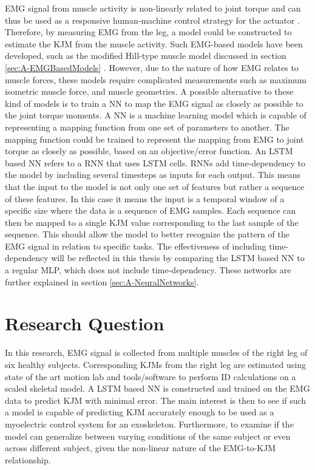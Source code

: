 \documentclass[../main.tex]{subfiles}
\begin{document}
\Ac{EMG} signal from muscle activity is non-linearly related to joint torque and can thus be used as a responsive human-machine control strategy for the actuator \cite{Young2017}.
Therefore, by measuring \ac{EMG} from the leg, a model could be constructed to estimate the \ac{KJM} from the muscle activity.
Such \ac{EMG}-based models have been developed, such as the modified Hill-type muscle model discussed in section \ref{sec:A-EMGBasedModels} \cite{Pizzolato2015, Erdemir2007, Lloyd2003}.
However, due to the nature of how \ac{EMG} relates to muscle forces, these models require complicated measurements such as maximum isometric muscle force, and muscle geometries.
A possible alternative to these kind of models is to train a \ac{NN} to map the \ac{EMG} signal as closely as possible to the joint torque moments.
A \ac{NN} is a machine learning model which is capable of representing a mapping function from one set of parameters to another. 
The mapping function could be trained to represent the mapping from \ac{EMG} to joint torque as closely as possible, based on an objective/error function.
An \ac{LSTM} based \ac{NN} refers to a \ac{RNN} that uses \ac{LSTM} cells.
\acp{RNN} add time-dependency to the model by including several timesteps as inputs for each output.
This means that the input to the model is not only one set of features but rather a sequence of these features.
In this case it means the input is a temporal window of a specific size where the data is a sequence of \ac{EMG} samples.
Each sequence can then be mapped to a single \ac{KJM} value corresponding to the last sample of the sequence.
This should allow the model to better recognize the pattern of the \ac{EMG} signal in relation to specific tasks.
The effectiveness of including time-dependency will be reflected in this thesis by comparing the \ac{LSTM} based \ac{NN} to a regular \ac{MLP}, which does not include time-dependency.
These networks are further explained in section \ref{sec:A-NeuralNetworks}.

\section{Research Question}
In this research, \ac{EMG} signal is collected from multiple muscles of the right leg of six healthy subjects. 
Corresponding \acp{KJM} from the right leg are estimated using state of the art motion lab and tools/software to perform \ac{ID} calculations on a scaled skeletal model.
A \ac{LSTM} based \ac{NN} is constructed and trained on the \ac{EMG} data to predict \ac{KJM} with minimal error.
The main interest is then to see if such a model is capable of predicting \ac{KJM} accurately enough to be used as a myoelectric control system for an exoskeleton.
Furthermore, to examine if the model can generalize between varying conditions of the same subject or even across different subject, given the non-linear nature of the \ac{EMG}-to-\ac{KJM} relationship.
\end{document}
